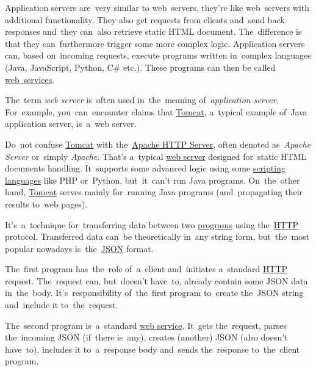 \label{applicationserver}
Application servers are~very similar to web~servers, they're like web~servers with additional functionality.
They also get requests from clients and~send back responses and~they can~also retrieve static HTML document.
The~difference is that they can~furthermore trigger some more complex logic.
Application servers can, based on~incoming requests, execute programs written in~complex languages (Java, JavaScript, Python, C\# etc.).
These programs can then be called \hyperref[webserviceapplication]{web~services}.

\warning The~term \textit{web server} is~often used in~the~meaning of~\textit{application server}.
For~example, you~can~encounter claims that \hyperref[tomcat]{Tomcat}, a~typical example of~Java application server, is~a~web server.

\warning Do~not confuse \hyperref[tomcat]{Tomcat} with the~\href{https://en.wikipedia.org/wiki/Apache_HTTP_Server}{Apache HTTP Server}, often denoted as~\textit{Apache Server} or~simply \textit{Apache}.
That's a~typical \hyperref[webserver]{web server} designed for~static HTML documents handling.
It~supports some advanced logic using some \hyperref[scriptinglanguages]{scripting languages} like PHP or~Python, but~it~can't run Java programs.
On~the~other hand, \hyperref[tomcat]{Tomcat} serves mainly for~running Java programs (and~propagating their results to~web pages).

\label{dns}

\label{rest}
It's~a~technique for~transferring data between two \hyperref[applicationprocessprogramservicethread]{programs} using the~\hyperref[http]{HTTP} protocol.
Transferred data can~be theoretically in~any string form, but~the~most popular nowadays is~the~\hyperref[json]{JSON} format.

The~first program has~the~role of~a~client and~initiates a~standard \hyperref[http]{HTTP} request.
The~request can, but~doesn't have~to, already contain some JSON data in~the~body.
It's~responsibility of~the~first program to~create the~JSON string and~include it to~the~request.

The~second program is~a~standard \hyperref[webserviceapplication]{web service}.
It~gets the~request, parses the~incoming JSON (if~there is~any), creates (another) JSON (also doesn't have~to), includes it to~a~response body and~sends the~response to~the~client program.

